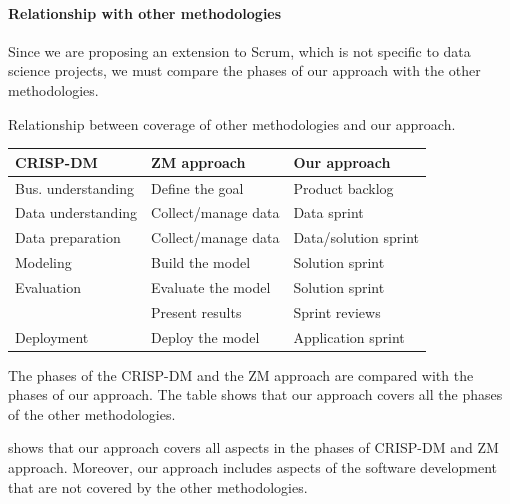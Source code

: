
\paragraph{Relationship with other methodologies}

Since we are proposing an extension to Scrum, which is not specific to data science
projects, we must compare the phases of our approach with the other methodologies.

\begin{tablebox}[label=tab:phases]{Relationship between coverage of other methodologies and our approach.}
  \centering
  \small %
  \begin{tabular}{lll}
    \toprule
    \textbf{CRISP-DM} & \textbf{ZM approach} & \textbf{Our approach} \\
    \midrule
    Bus. understanding & Define the goal & Product backlog \\
    Data understanding & Collect/manage data & Data sprint \\
    Data preparation & Collect/manage data & Data/solution sprint \\
    Modeling & Build the model & Solution sprint \\
    Evaluation & Evaluate the model & Solution sprint \\
    & Present results & Sprint reviews \\
    Deployment & Deploy the model & Application sprint \\
    \bottomrule
  \end{tabular}
  \tcblower
  The phases of the CRISP-DM and the ZM approach are compared with the phases of our
  approach.  The table shows that our approach covers all the phases of the other
  methodologies.
\end{tablebox}

 shows that our approach covers all aspects in the phases of CRISP-DM and
ZM approach.  Moreover, our approach includes aspects of the software development that
are not covered by the other methodologies.

